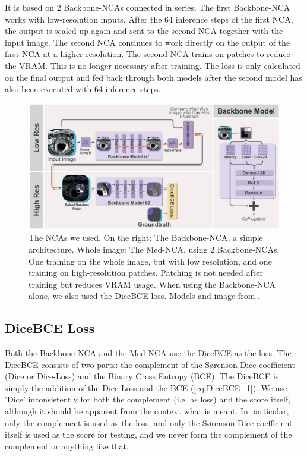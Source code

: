 It is based on 2 Backbone-NCAs connected in series. The first Backbone-NCA works with low-resolution inputs. After the 64 inference steps of the first NCA, the output is scaled up again and sent to the second NCA together with the input image. The second NCA continues to work directly on the output of the first NCA at a higher resolution. The second NCA trains on patches to reduce the VRAM. This is no longer necessary after training. The loss is only calculated on the final output and fed back through both models after the second model has also been executed with 64 inference steps.

\begin{figure}[h!]
    \centering
    \includegraphics[width=\linewidth]{Graphics/MedNCA_2D.png}
    \caption{The NCAs we used. On the right: The Backbone-NCA, a simple architecture. Whole image: The Med-NCA, using 2 Backbone-NCAs. One training on the whole image, but with low resolution, and one training on high-resolution patches. Patching is not needed after training but reduces VRAM usage. When using the Backbone-NCA alone, we also used the DiceBCE loss. Models and image from \cite{kalkhof:2023:medNCA}.}
    \label{fig:NCA_Models}
\end{figure}

\subsection{DiceBCE Loss}
\label{DiceBCE-Loss}
Both the Backbone-NCA and the Med-NCA use the DiceBCE as the loss. The DiceBCE consists of two parts: the complement of the S{\o}renson-Dice coefficient (Dice or Dice-Loss) and the Binary Cross Entropy (BCE). The DiceBCE is simply the addition of the Dice-Loss and the BCE (\ref{eq:DiceBCE_1}). We use 'Dice' inconsistently for both the complement (i.e. as loss) and the score itself, although it should be apparent from the context what is meant. In particular, only the complement is used as the loss, and only the S{\o}renson-Dice coefficient itself is used as the score for testing, and we never form the complement of the complement or anything like that.

